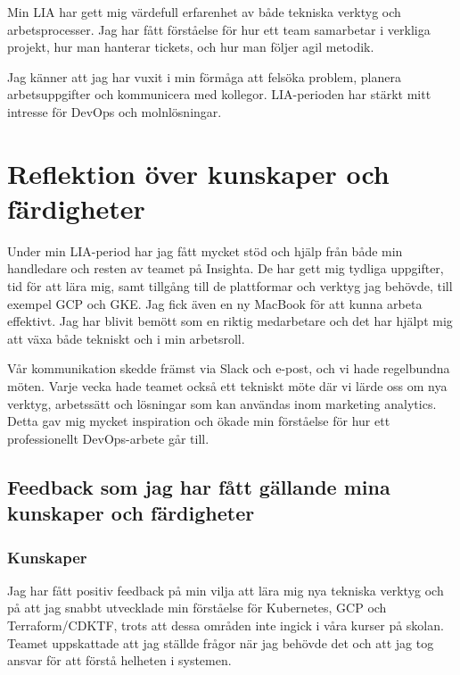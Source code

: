



















Min LIA har gett mig värdefull erfarenhet av både tekniska verktyg och arbetsprocesser. Jag har fått förståelse för hur ett team samarbetar i verkliga projekt, hur man hanterar tickets, och hur man följer agil metodik. 

Jag känner att jag har vuxit i min förmåga att felsöka problem, planera arbetsuppgifter och kommunicera med kollegor. LIA-perioden har stärkt mitt intresse för DevOps och molnlösningar.


\section{Reflektion över kunskaper och färdigheter}
\label{sec:reflektion}

Under min LIA-period har jag fått mycket stöd och hjälp från både min handledare och resten av teamet på Insighta. De har gett mig tydliga uppgifter, tid för att lära mig, samt tillgång till de plattformar och verktyg jag behövde, till exempel GCP och GKE. Jag fick även en ny MacBook för att kunna arbeta effektivt. Jag har blivit bemött som en riktig medarbetare och det har hjälpt mig att växa både tekniskt och i min arbetsroll.

Vår kommunikation skedde främst via Slack och e-post, och vi hade regelbundna möten. Varje vecka hade teamet också ett tekniskt möte där vi lärde oss om nya verktyg, arbetssätt och lösningar som kan användas inom marketing analytics. Detta gav mig mycket inspiration och ökade min förståelse för hur ett professionellt DevOps-arbete går till.


\subsection{Feedback som jag har fått gällande mina kunskaper och färdigheter}
\label{subsec:feedback}
\subsubsection{Kunskaper}
\label{subsubsec:kunskaper_feedback}

Jag har fått positiv feedback på min vilja att lära mig nya tekniska verktyg och på att jag snabbt utvecklade min förståelse för Kubernetes, GCP och Terraform/CDKTF, trots att dessa områden inte ingick i våra kurser på skolan. Teamet uppskattade att jag ställde frågor när jag behövde det och att jag tog ansvar för att förstå helheten i systemen.

